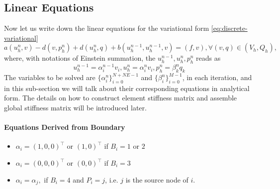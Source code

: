 \subsection{Linear Equations}
Now let us write down the linear equations for the variational form \eqref{eq:discrete-variational}
\[
  a(u_h^n,v)-d(v,p^n_h)+d(u_h^n,q)+b(u_h^{n-1},u_h^{n-1},v)=(f,v),\forall (v,q)\in(V_h,Q_h),
  \]
where, with notations of Einstein summation, the $u_h^{n-1},u_h^n,p_h^n$ reads as
\begin{equation}\label{eq:uf-linear-approximation}
  u_h^{n-1}=\alpha_i^{n-1}v_i,u_h^n=\alpha_i^nv_i,p_h^n=\beta_k^nq_k
\end{equation}
The variables to be solved are $\{\alpha_i^n\}_{i=0}^{N+NE-1}$ and $\{\beta_i^n\}_{i=0}^{M-1}$, in each iteration, 
and in this sub-section we will talk about their corresponding equations in analytical form.
The details on how to construct element stiffness matrix and assemble global stiffness matrix 
will be introduced later.

\paragraph{Equations Derived from Boundary}
\begin{itemize}
  \item $\alpha_i=(1,0,0)^\top \text{ or } (1,0)^\top$ if $B_i=1$ or $2$
  \item $\alpha_i=(0,0,0)^\top \text{ or } (0,0)^\top$ if $B_i=3$
  \item $\alpha_i=\alpha_j,$ if $B_i=4$ and $P_i=j$, i.e. $j$ is the source node of $i$.
\end{itemize}

